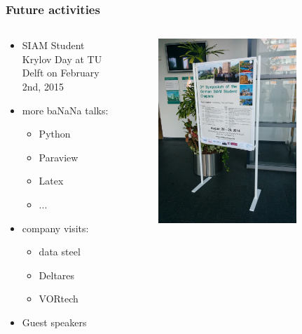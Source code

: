 \documentclass{beamer}
\begin{document}
\begin{frame}
\frametitle{Future activities}
\begin{columns}
 \begin{column}{0.8\textwidth}
 \begin{itemize}
  \item SIAM Student Krylov Day at TU Delft on February 2nd, 2015
  \item more ba{\color{red}NaN}a talks:
  \begin{itemize}
      \item Python
      \item Paraview
      \item Latex
      \item ...
  \end{itemize}
  \item company visits:
    \begin{itemize}
      \item data steel
      \item Deltares
      \item VORtech
  \end{itemize}
   \item Guest speakers
 \end{itemize}

 \end{column}

 \begin{column}{0.4\textwidth}
  \begin{figure}[t]
  \centering
  \includegraphics[width=0.8\textwidth]{images/IMG_20140825_100740}
  \end{figure}
 \end{column}
 \end{columns}
\end{frame}
\end{document}
